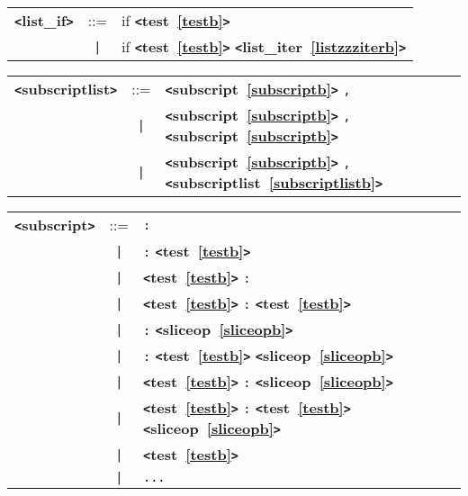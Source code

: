 \documentclass[12pt]{article}
\begin{document}

\label{listzzzifb}
\begin{tabular}{lcl}
{\bf \verb+<+list\_if\verb+>+} & ::=  & if {\bf \verb+<+test~\ref{testb}\verb+>+}  \\
 & \verb+|+  & if {\bf \verb+<+test~\ref{testb}\verb+>+}  {\bf \verb+<+list\_iter~\ref{listzzziterb}\verb+>+}  \\
\end{tabular}

\label{subscriptlistb}
\begin{tabular}{lcl}
{\bf \verb+<+subscriptlist\verb+>+} & ::=  & {\bf \verb+<+subscript~\ref{subscriptb}\verb+>+}  \verb|,| \\
 & \verb+|+  & {\bf \verb+<+subscript~\ref{subscriptb}\verb+>+}  \verb|,| {\bf \verb+<+subscript~\ref{subscriptb}\verb+>+}  \\
 & \verb+|+  & {\bf \verb+<+subscript~\ref{subscriptb}\verb+>+}  \verb|,| {\bf \verb+<+subscriptlist~\ref{subscriptlistb}\verb+>+}  \\
\end{tabular}

\label{subscriptb}
\begin{tabular}{lcl}
{\bf \verb+<+subscript\verb+>+} & ::=  & \verb|:| \\
 & \verb+|+  & \verb|:| {\bf \verb+<+test~\ref{testb}\verb+>+}  \\
 & \verb+|+  & {\bf \verb+<+test~\ref{testb}\verb+>+}  \verb|:| \\
 & \verb+|+  & {\bf \verb+<+test~\ref{testb}\verb+>+}  \verb|:| {\bf \verb+<+test~\ref{testb}\verb+>+}  \\
 & \verb+|+  & \verb|:| {\bf \verb+<+sliceop~\ref{sliceopb}\verb+>+}  \\
 & \verb+|+  & \verb|:| {\bf \verb+<+test~\ref{testb}\verb+>+}  {\bf \verb+<+sliceop~\ref{sliceopb}\verb+>+}  \\
 & \verb+|+  & {\bf \verb+<+test~\ref{testb}\verb+>+}  \verb|:| {\bf \verb+<+sliceop~\ref{sliceopb}\verb+>+}  \\
 & \verb+|+  & {\bf \verb+<+test~\ref{testb}\verb+>+}  \verb|:| {\bf \verb+<+test~\ref{testb}\verb+>+}  {\bf \verb+<+sliceop~\ref{sliceopb}\verb+>+}  \\
 & \verb+|+  & {\bf \verb+<+test~\ref{testb}\verb+>+}  \\
 & \verb+|+  & \verb|...| \\
\end{tabular}
\end{document}
